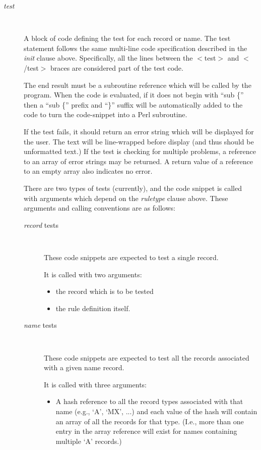 \begin{description}
\item [{\it test}]\verb" "

A block of code defining the test for each record or name.  The
test statement follows the same multi-line code specification
described in the {\it init} clause above.  Specifically, all the lines
between the $<$test$>$ and $<$/test$>$ braces are considered part of the test
code.

The end result must be a subroutine reference which will be called by
the  program.  When the code is evaluated, if it does not
begin with ``sub \{'' then a ``sub \{'' prefix and ``\}'' suffix will be
automatically added to the code to turn the code-snippet into a
Perl subroutine.

If the test fails, it should return an error string which will be displayed
for the user.  The text will be line-wrapped before display (and thus should
be unformatted text.)  If the test is checking for multiple problems, a
reference to an array of error strings may be returned.  A return value of a
reference to an empty array also indicates no error.

There are two types of tests (currently), and the code snippet is
called with arguments which depend on the {\it ruletype} clause above.
These arguments and calling conventions are as follows:

\begin{description}

\item [{\it record} tests]\verb" "

These code snippets are expected to test a single  record.

It is called with two arguments:

\begin{itemize}
\item the record which is to be tested
\item the rule definition itself.
\end{itemize}

\item [{\it name} tests]\verb" "

These code snippets are expected to test all the records
associated with a given name record.

It is called with three arguments:

\begin{itemize}
\item A hash reference to all the record types associated
with that name (e.g., `A', `MX', ...) and each value of
the hash will contain an array of all the records for
that type.  (I.e., more than one entry in the array reference
will exist for names containing multiple `A' records.)


\end{itemize}
\end{description}
\end{description}
